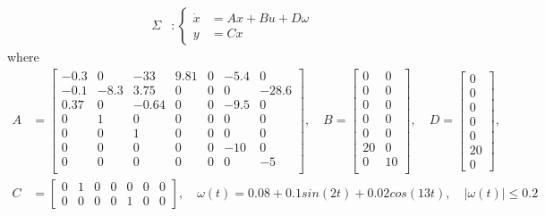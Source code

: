 \documentclass[11pt,letterpaper,twoside,openright]{report}
\begin{document}
\begin{equation}\label{ecu: CH4 System example 1}
	\begin{split}
		\Sigma &: \left\{
		\begin{array}{rl}
			\dot{x} &= Ax + Bu + D\omega \\
			y &= Cx
		\end{array}
		\right.
	\end{split}
\end{equation}
where
\begin{equation}
	\begin{split}
	A &=\begin{bmatrix} 
		-0.3 & 0 & -33 & 9.81 & 0 & -5.4 & 0 \\
		-0.1 & -8.3 & 3.75 & 0 & 0 & 0 & -28.6 \\
		0.37 & 0 & -0.64 & 0 & 0 & -9.5 & 0 \\
		0 & 1 & 0 & 0 & 0 & 0 & 0 \\
		0 & 0 & 1 & 0 & 0 & 0 & 0 \\
		0 & 0 & 0 & 0 & 0 & -10 & 0 \\
		0 & 0 & 0 & 0 & 0 & 0 & -5 \\
	\end{bmatrix}, \quad 
	B=\begin{bmatrix} 
		0 & 0 \\
		0 & 0 \\
		0 & 0 \\
		0 & 0 \\
		0 & 0 \\
		20 & 0 \\
		0 & 10 \\
	\end{bmatrix}, \quad
	D=\begin{bmatrix}
		0 \\
		0 \\
		0 \\
		0 \\
		0 \\
		20 \\
		0
	\end{bmatrix}, \\
	C &=\begin{bmatrix}
		0 & 1 & 0 & 0 & 0 & 0 & 0 \\
		0 & 0 & 0 & 0 & 1 & 0 & 0
	\end{bmatrix}, \quad \omega(t) = 0.08 + 0.1 sin(2t) + 0.02 cos(13t), \quad |\omega(t)| \leq 0.2
	\end{split}
\end{equation}
\end{document}
